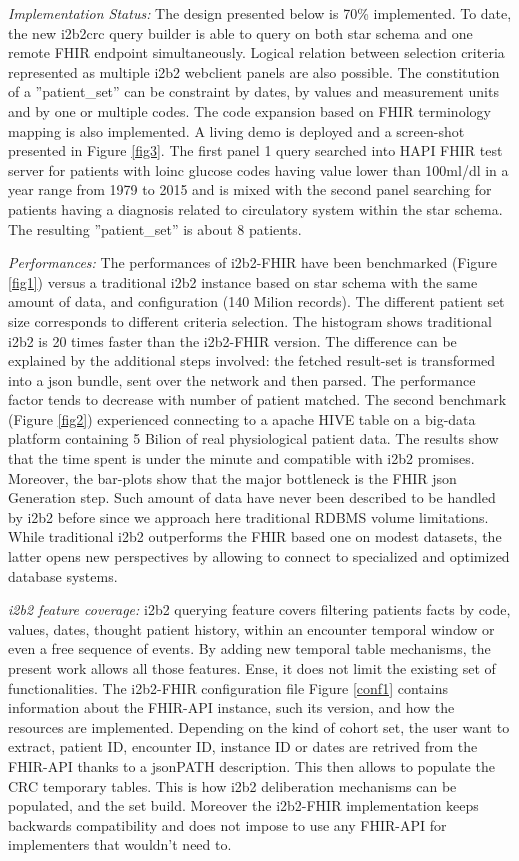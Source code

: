 \documentclass{amia}
\begin{document}
\textit{Implementation Status: } The design presented below is 70\% implemented. To date, the new i2b2crc query builder is able to query on both star schema and one remote FHIR endpoint simultaneously. Logical relation between selection criteria represented as multiple i2b2 webclient panels are also possible. The constitution of a ''patient\_set'' can be constraint by dates, by values and measurement units and by one or multiple codes. The code expansion based on FHIR terminology mapping is also implemented. A living demo is deployed\cite{i2b2-fhir-demo} and a screen-shot presented in Figure \ref{fig3}. The first panel 1 query searched into HAPI FHIR test server for patients with loinc glucose codes having value lower than 100ml/dl in a year range from 1979 to 2015 and is mixed with the second panel searching for patients having a diagnosis related to circulatory system within the star schema. The resulting ''patient\_set'' is about 8 patients.

\textit{Performances:} The performances of i2b2-FHIR have been benchmarked (Figure \ref{fig1}) versus a traditional i2b2 instance based on star schema with the same amount of data, and configuration (140 Milion records). The different patient set size corresponds to different criteria selection. The histogram shows traditional i2b2 is 20 times faster than the i2b2-FHIR version. The difference can be explained by the additional steps involved: the fetched result-set is transformed into a json bundle, sent over the network and then parsed. The performance factor tends to decrease with number of patient matched. The second benchmark (Figure \ref{fig2}) experienced connecting to a apache HIVE table on a big-data platform containing 5 Bilion of real physiological patient data. The results show that the time spent is under the minute and compatible with i2b2 promises. Moreover, the bar-plots show that the major bottleneck is the FHIR json Generation step. Such amount of data have never been described to be handled by i2b2 before since we approach here traditional RDBMS volume limitations. While traditional i2b2 outperforms the FHIR based one on modest datasets, the latter opens new perspectives by allowing to connect to specialized and optimized database systems.


\textit{i2b2 feature coverage: }i2b2 querying feature covers filtering patients facts by code, values, dates, thought patient history, within an encounter temporal window or even a free sequence of events. By adding new temporal table mechanisms, the present work allows all those features. Ense, it does not limit the existing set of functionalities. The i2b2-FHIR configuration file Figure \ref{conf1} contains information about the FHIR-API instance, such its version, and how the resources are implemented. Depending on the kind of cohort set, the user want to extract, patient ID, encounter ID, instance ID or dates are retrived from the FHIR-API thanks to a jsonPATH description. This then allows to populate the CRC temporary tables. This is how i2b2 deliberation mechanisms can be populated, and the set build. Moreover the i2b2-FHIR implementation keeps backwards compatibility and does not impose to use any FHIR-API for implementers that wouldn't need to.
\end{document}
